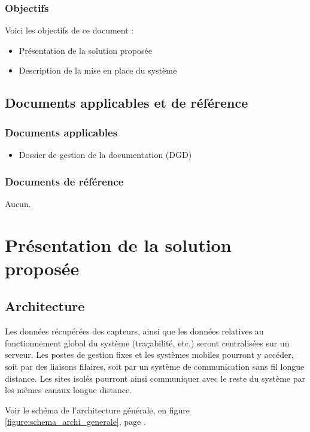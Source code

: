 \documentclass[a4paper, 11pt, draft]{article}
\newcommand\fullref[1]{\ref{#1}, page \pageref{#1}}
\begin{document}
\subsubsection{Objectifs}

Voici les objectifs de ce document :
\begin{itemize}
\item Présentation de la solution proposée
\item Description de la mise en place du système
\end{itemize}

\subsection{Documents applicables et de référence}

\subsubsection{Documents applicables}

\begin{itemize}
\item Dossier de gestion de la documentation (DGD)
\end{itemize}

\subsubsection{Documents de référence}

Aucun.

\section{Présentation de la solution proposée}

\subsection{Architecture}

Les données récupérées des capteurs, ainsi que les données relatives au fonctionnement global du système (traçabilité, etc.) seront centralisées sur un serveur. Les postes de gestion fixes et les systèmes mobiles pourront y accéder, soit par des liaisons filaires, soit par un système de communication sans fil longue distance. Les sites isolés pourront ainsi communiquer avec le reste du système par les mêmes canaux longue distance.

Voir le schéma de l'architecture générale, en figure \fullref{figure:schema_archi_generale}.
\end{document}
